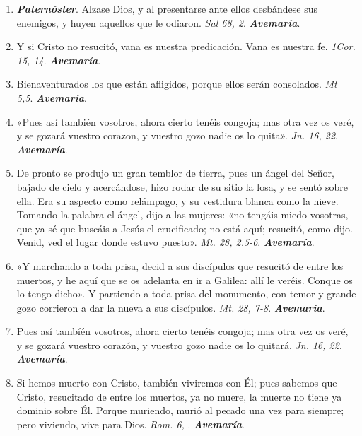 \documentclass[./rosary.tex]{subfiles}
\begin{document}
\begin{enumerate}
      \item \textbf{\emph{Paternóster}}. Alzase Dios, y al presentarse ante ellos desbándese sus enemigos, y huyen aquellos que le odiaron. \emph{Sal 68, 2}. \textbf{\emph{Avemaría}}.

      \item Y si Cristo no resucitó, vana es nuestra predicación. Vana es nuestra fe. \emph{1Cor. 15, 14}. \textbf{\emph{Avemaría}}.

      \item Bienaventurados los que están afligidos, porque ellos serán consolados. \emph{Mt 5,5}. \textbf{\emph{Avemaría}}.

      \item «Pues así también vosotros, ahora cierto tenéis congoja; mas otra vez os veré, y se gozará vuestro corazon, y vuestro gozo nadie os lo quita». \emph{Jn. 16, 22}. \textbf{\emph{Avemaría}}.

      \item De pronto se produjo un gran temblor de tierra, pues un ángel del Señor, bajado de cielo y acercándose, hizo rodar de su sitio la losa, y se sentó sobre ella.
            Era su aspecto como relámpago, y su vestidura blanca como la nieve. Tomando la palabra el ángel, dijo a las mujeres: «no tengáis miedo vosotras, que ya sé que buscáis
            a Jesús el crucificado; no está aquí; resucitó, como dijo. Venid, ved el lugar donde estuvo puesto». \emph{Mt. 28, 2.5-6}. \textbf{\emph{Avemaría}}.

      \item «Y marchando a toda prisa, decid a sus discípulos que resucitó de entre los muertos, y he aquí que se os adelanta en ir a Galilea: allí le veréis. Conque os lo tengo dicho».
            Y partiendo a toda prisa del monumento, con temor y grande gozo corrieron a dar la nueva a sus discípulos. \emph{Mt. 28, 7-8}. \textbf{\emph{Avemaría}}.

      \item Pues así tambíén vosotros, ahora cierto tenéis congoja; mas otra vez os veré, y se gozará vuestro corazón, y vuestro gozo nadie os lo quitará. \emph{Jn. 16, 22}. \textbf{\emph{Avemaría}}.

      \item Si hemos muerto con Cristo, también viviremos con Él; pues sabemos que Cristo, resucitado de entre los muertos, ya no muere, la muerte no tiene ya dominio sobre Él. Porque
            muriendo, murió al pecado una vez para siempre; pero viviendo, vive para Dios. \emph{Rom. 6, }. \textbf{\emph{Avemaría}}.


\end{enumerate}
\end{document}
